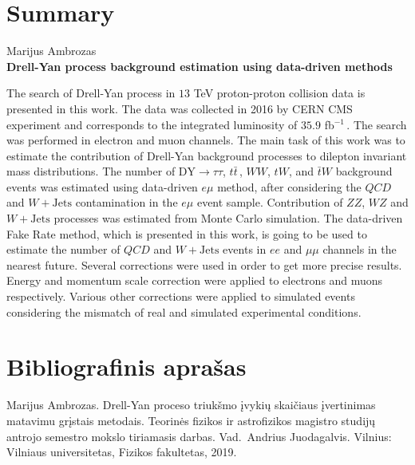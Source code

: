 \documentclass[a4paper, 12pt, oneside]{article}
\newcommand{\ZZ}{Z\! Z}
\newcommand{\WZ}{W\! Z}
\newcommand{\ttbar}{t\bar{t}}
\newcommand{\emu}{e\mu}
\newcommand{\WJets}{W\! +\!\mathrm{Jets}}
\newcommand{\DYtau}{\mathrm{DY} \! \rightarrow \! \tau\tau}
\newcommand{\invfb}{fb$^{-1}\,$}
\newcommand{\QCD}{QC\! D}
\begin{document}
\section*{Summary}
\begin{center} Marijus Ambrozas \\ \centering \textbf{Drell-Yan process background estimation using data-driven methods} \end{center}

The search of Drell-Yan process in $13$ TeV proton-proton collision data is presented in this work.
The data was collected in 2016 by CERN CMS experiment and corresponds to the integrated luminosity of $35.9$ \invfb.
The search was performed in electron and muon channels.
The main task of this work was to estimate the contribution of Drell-Yan background processes to dilepton invariant mass distributions.
The number of $\DYtau$, $\ttbar\,$, $WW$, $tW$, and $\bar{t}W$ background events was estimated using data-driven $\emu$ method,
after considering the $\QCD$ and $\WJets$ contamination in the $\emu$ event sample.
Contribution of $\ZZ$, $\WZ$ and $\WJets$ processes was estimated from Monte Carlo simulation.
The data-driven Fake Rate method, which is presented in this work, is going to be used to estimate the number of $\QCD$ and $\WJets$ events
in $ee$ and $\mu\mu$ channels in the nearest future.
Several corrections were used in order to get more precise results.
Energy and momentum scale correction were applied to electrons and muons respectively.
Various other corrections were applied to simulated events considering the mismatch of real and simulated experimental conditions.


\section*{Bibliografinis aprašas}
Marijus Ambrozas. Drell-Yan proceso triukšmo įvykių skaičiaus įvertinimas matavimu grįstais metodais.
Teorinės fizikos ir astrofizikos magistro studijų antrojo semestro mokslo tiriamasis darbas.
Vad.\ Andrius Juodagalvis. Vilnius: Vilniaus universitetas, Fizikos fakultetas, 2019.
\end{document}
